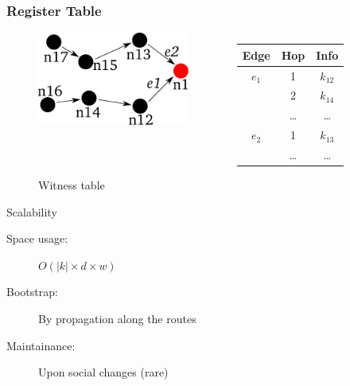 \documentclass{beamer}
\begin{document}

\begin{frame}

  \frametitle{Register Table}

  \begin{figure}
    \begin{columns}
      \begin{column}{5cm}
	\includegraphics[width=5cm]{./pictures/register_table} 
      \end{column}
      \begin{column}{5cm}
	\begin{center}
	  \begin{tabular}{|c|c|c|}
	    \hline
	    Edge     &  Hop     &  Info \\
	    \hline
	    \hline
	    $e_1$    &  1         &  $k_{12}$ \\
	    &  2         &  $k_{14}$ \\
	    &  \ldots    &  \ldots       \\
	    \hline
	    \hline
	    $e_2$    &  1         &  $k_{13}$ \\
	    & \ldots     &  \ldots       \\
	    \hline
	\end{tabular}
	\end{center}
      \end{column}
    \end{columns}
    \caption{Witness table}
  \end{figure}

  \begin{block}{Scalability}
    \begin{description}
    \item[Space usage:] $O( |k| \times d \times w )$
    \item[Bootstrap:] By propagation along the routes
    \item[Maintainance:] Upon social changes (rare)
    \end{description}
  \end{block}

\end{frame}

\end{document}
